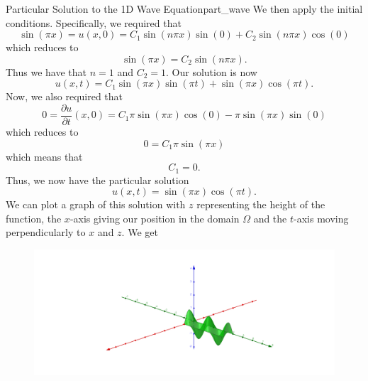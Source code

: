 \begin{ex}{Particular Solution to the 1D Wave Equation}{part_wave}
        We then apply the initial conditions. Specifically, we required that
        \[
        \sin(\pi x) = u(x,0) = C_1 \sin(n\pi x) \sin(0)+ C_2 \sin(n\pi x) \cos(0)
        \]
        which reduces to
        \[
        \sin(\pi x) = C_2 \sin(n\pi x).
        \]
        Thus we have that $n=1$ and $C_2=1$.  Our solution is now
        \[
        u(x,t)=C_1 \sin(\pi x)\sin(\pi t) +  \sin(\pi x)\cos(\pi t).
        \]
        Now, we also required that
        \[
        0=\frac{\partial u}{\partial t}(x,0) =C_1 \pi \sin(\pi x)\cos(0) - \pi \sin(\pi x) \sin(0)
        \]
        which reduces to
        \[
        0 = C_1 \pi \sin(\pi x)
        \]
        which means that
        \[
        C_1=0.
        \]
        Thus, we now have the particular solution
        \[
        \boxed{u(x,t)=\sin(\pi x)\cos(\pi t).}
        \]
        We can plot a graph of this solution with $z$ representing the height of the function, the $x$-axis giving our position in the domain $\Omega$ and the $t$-axis moving perpendicularly to $x$ and $z$. We get
        \begin{figure}[H]
            \centering
            \includegraphics[width=.5\textwidth]{Figures/wave_solution_2.png}
        \end{figure}
        \end{ex}

% 
